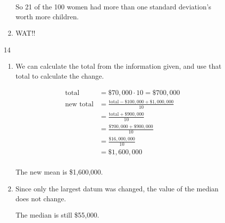 \documentclass[12pt,letterpaper]{article}
\begin{document}
\begin{enumerate}
\begin{enumerate}
\begin{enumerate}[label=\arabic* )]
              So 21 of the 100 women had more than one standard deviation's worth more children.

            \item
              WAT!!
          \end{enumerate}
        \item [14]
          \begin{enumerate}[label=\arabic* )]
            \item
              We can calculate the total from the information given,
              and use that total to calculate the change.

              \begin{align*}
                \text{total} &= \$70,000 \cdot 10 = \$700,000 \\
                \text{new total} &= \frac{\text{total} - \$100,000 + \$1,000,000}{10} \\
                &= \frac{\text{total} + \$900,000}{10} \\
                &= \frac{\$700,000 + \$900,000}{10} \\
                &= \frac{\$16,000,000}{10} \\
                &= \$1,600,000 \\
              \end{align*}

              The new mean is \$1,600,000.

            \item
              Since only the largest datum was changed,
              the value of the median does not change.

              The median is still \$55,000.
          \end{enumerate}
      \end{enumerate}
  \end{enumerate}
\end{document}
